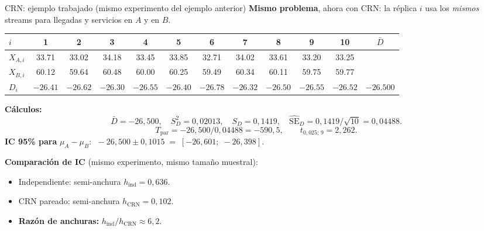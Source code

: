 \documentclass[aspectratio=1610, 10pt]{beamer}
\begin{document}
\begin{frame}{CRN: ejemplo trabajado (mismo experimento del ejemplo anterior)}
\textbf{Mismo problema}, ahora con CRN: la réplica $i$ usa los \emph{mismos} streams para llegadas y servicios en $A$ y en $B$.

\vspace{0.1cm}
\begin{table}
\centering
\scriptsize
\begin{tabular}{l|cccccccccc|c}
\toprule
$i$        & 1 & 2 & 3 & 4 & 5 & 6 & 7 & 8 & 9 & 10 & $\bar D$ \\
\midrule
$X_{A,i}$  & 33.71 & 33.02 & 34.18 & 33.45 & 33.85 & 32.71 & 34.02 & 33.61 & 33.20 & 33.25 &  \\
$X_{B,i}$  & 60.12 & 59.64 & 60.48 & 60.00 & 60.25 & 59.49 & 60.34 & 60.11 & 59.75 & 59.77 &  \\
$D_i$      & $-26{.}41$ & $-26{.}62$ & $-26{.}30$ & $-26{.}55$ & $-26{.}40$ & $-26{.}78$ & $-26{.}32$ & $-26{.}50$ & $-26{.}55$ & $-26{.}52$ & $-26{.}500$ \\
\bottomrule
\end{tabular}
\end{table}

\vspace{0.2cm}
\textbf{Cálculos:}
\[
\bar D = -26{,}500,\quad S_D^2 = 0{,}02013,\quad S_D = 0{,}1419, \quad \widehat{\mathrm{SE}}_D = 0{,}1419/\sqrt{10} = 0{,}04488.
\]
\[
T_{\text{par}} = -26{,}500 / 0{,}04488 = -590{,}5, \qquad t_{0{,}025;\,9} = 2{,}262.
\]
\textbf{IC 95\% para} $\mu_A-\mu_B$: $\;-26{,}500 \pm 0{,}1015 \;=\; [-26{,}601;\; -26{,}398]$.

\vspace{0.2cm}
\textbf{Comparación de IC} (mismo experimento, mismo tamaño muestral):
\begin{itemize}\small
\item Independiente: semi-anchura $h_{\text{ind}} = 0{,}636$.
\item CRN pareado: \;\;\;\; semi-anchura $h_{\text{CRN}} = 0{,}102$.
\item \textbf{Razón de anchuras:} $h_{\text{ind}}/h_{\text{CRN}} \approx 6{,}2$.
\end{itemize}
\end{frame}
\end{document}
